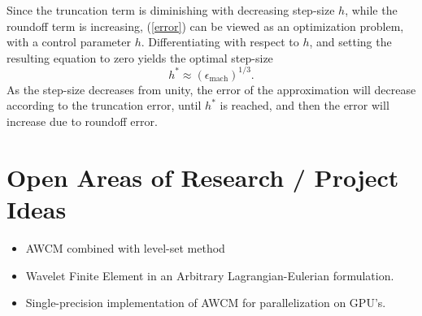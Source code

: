 \documentclass[11pt]{article}
\begin{document}
Since the truncation term is diminishing with decreasing step-size $h$, while the roundoff term is increasing, (\ref{error}) 
can be viewed as an optimization problem, with a control parameter $h$. Differentiating with respect to $h$, and setting
the resulting equation to zero yields the optimal step-size
\begin{equation}
h^{\ast} \approx (\epsilon_{\text{mach}})^{1/3}.
\end{equation}
As the step-size decreases from unity, the error of the approximation will decrease according to the truncation error, until
$h^{\ast}$ is reached, and then the error will increase due to roundoff error.
\section{Open Areas of Research / Project Ideas}
\begin{itemize}
	\item AWCM combined with level-set method 
	\item Wavelet Finite Element in an Arbitrary Lagrangian-Eulerian formulation.
	\item Single-precision implementation of AWCM for parallelization on GPU's.
\end{itemize}
\end{document}
